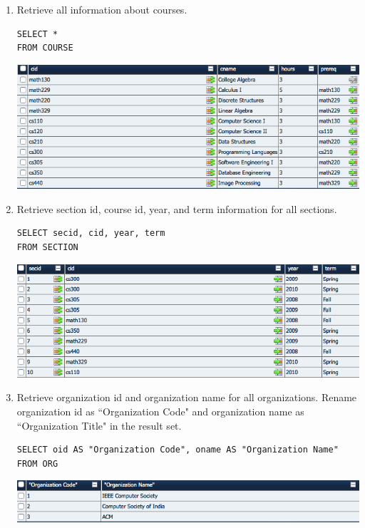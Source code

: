 \documentclass[11pt]{article}
\begin{document}
\begin{enumerate}

\item Retrieve all information about courses.

\begin{verbatim}
SELECT *
FROM COURSE
\end{verbatim}

\includegraphics[scale=0.5]{1.png}

\item Retrieve section id, course id, year, and term information for all sections.

\begin{verbatim}
SELECT secid, cid, year, term
FROM SECTION
\end{verbatim}

\includegraphics[scale=0.5]{2.png}

\item Retrieve organization id and organization name for all organizations. Rename organization id as ``Organization Code" and organization name as ``Organization Title" in the result set.

\begin{verbatim}
SELECT oid AS "Organization Code", oname AS "Organization Name"
FROM ORG
\end{verbatim}

\includegraphics[scale=0.5]{3.png}


\end{enumerate}
\end{document}
